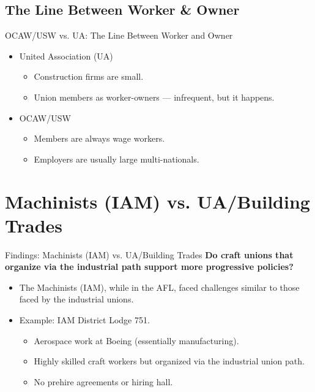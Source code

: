 \documentclass{beamer}
\begin{document}
\subsection{The Line Between Worker \& Owner}
\begin{frame}{OCAW/USW vs. UA: The Line Between Worker and Owner}
	\begin{itemize}
		\item United Association (UA)
		\begin{itemize}
			\item Construction firms are small.
			\item Union members as worker-owners — infrequent, but it happens.
		\end{itemize}
		\item OCAW/USW
			\begin{itemize}
				\item Members are always wage workers.
				\item Employers are usually large multi-nationals.
			\end{itemize}
	\end{itemize}
\end{frame}


\section{Machinists (IAM) vs. UA/Building Trades}
\begin{frame}{Findings: Machinists (IAM) vs. UA/Building Trades}
\textbf{Do craft unions that organize via the industrial path support more progressive policies?}\newline
	\begin{itemize}
		\item The Machinists (IAM), while in the AFL, faced challenges similar to those faced by the industrial unions.
		\item Example: IAM District Lodge 751.
		\begin{itemize}
			\item Aerospace work at Boeing (essentially manufacturing).
			\item Highly skilled craft workers but organized via the industrial union path.
			\item No prehire agreements or hiring hall.
		\end{itemize}
	\end{itemize}
\end{frame}
\end{document}
